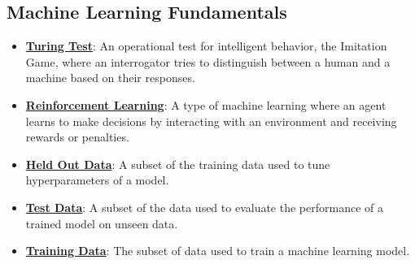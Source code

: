 \documentclass{article}%
\begin{document}
%
\subsection{Machine Learning Fundamentals}%
\label{subsec:MachineLearningFundamentals}%
\begin{itemize}[leftmargin=*]%
\item \href{https://purdue.brightspace.com/d2l/common/assets/pdfjs-d2l-dist/1.0.14-legacy/web/viewer.html?file=\%2Fcontent\%2Fenforced\%2F1095467-wl.202510.CS.24300.001\%2F02L2-Intro.pdf\%3Fou\%3D1095467\&lang=en-us\&container=d2l-fileviewer-rendered-pdf\&fullscreen=d2l-fileviewer-rendered-pdf-dialog\&height=667#page=6}{\textbf{Turing Test}}: An operational test for intelligent behavior, the Imitation Game, where an interrogator tries to distinguish between a human and a machine based on their responses.%
\item \href{https://purdue.brightspace.com/d2l/common/assets/pdfjs-d2l-dist/1.0.14-legacy/web/viewer.html?file=\%2Fcontent\%2Fenforced\%2F1095467-wl.202510.CS.24300.001\%2F02L2-Intro.pdf\%3Fou\%3D1095467\&lang=en-us\&container=d2l-fileviewer-rendered-pdf\&fullscreen=d2l-fileviewer-rendered-pdf-dialog\&height=667#page=46}{\textbf{Reinforcement Learning}}: A type of machine learning where an agent learns to make decisions by interacting with an environment and receiving rewards or penalties.%
\item \href{https://purdue.brightspace.com/d2l/common/assets/pdfjs-d2l-dist/1.0.14-legacy/web/viewer.html?file=\%2Fcontent\%2Fenforced\%2F1095467-wl.202510.CS.24300.001\%2F10L1-CrossValidation.pdf\%3Fou\%3D1095467\&lang=en-us\&container=d2l-fileviewer-rendered-pdf\&fullscreen=d2l-fileviewer-rendered-pdf-dialog\&height=667#page=10}{\textbf{Held Out Data}}: A subset of the training data used to tune hyperparameters of a model.%
\item \href{https://purdue.brightspace.com/d2l/common/assets/pdfjs-d2l-dist/1.0.14-legacy/web/viewer.html?file=\%2Fcontent\%2Fenforced\%2F1095467-wl.202510.CS.24300.001\%2F10L1-CrossValidation.pdf\%3Fou\%3D1095467\&lang=en-us\&container=d2l-fileviewer-rendered-pdf\&fullscreen=d2l-fileviewer-rendered-pdf-dialog\&height=667#page=6}{\textbf{Test Data}}: A subset of the data used to evaluate the performance of a trained model on unseen data.%
\item \href{https://purdue.brightspace.com/d2l/common/assets/pdfjs-d2l-dist/1.0.14-legacy/web/viewer.html?file=\%2Fcontent\%2Fenforced\%2F1095467-wl.202510.CS.24300.001\%2F10L1-CrossValidation.pdf\%3Fou\%3D1095467\&lang=en-us\&container=d2l-fileviewer-rendered-pdf\&fullscreen=d2l-fileviewer-rendered-pdf-dialog\&height=667#page=6}{\textbf{Training Data}}: The subset of data used to train a machine learning model.%

\end{itemize}
\end{document}
